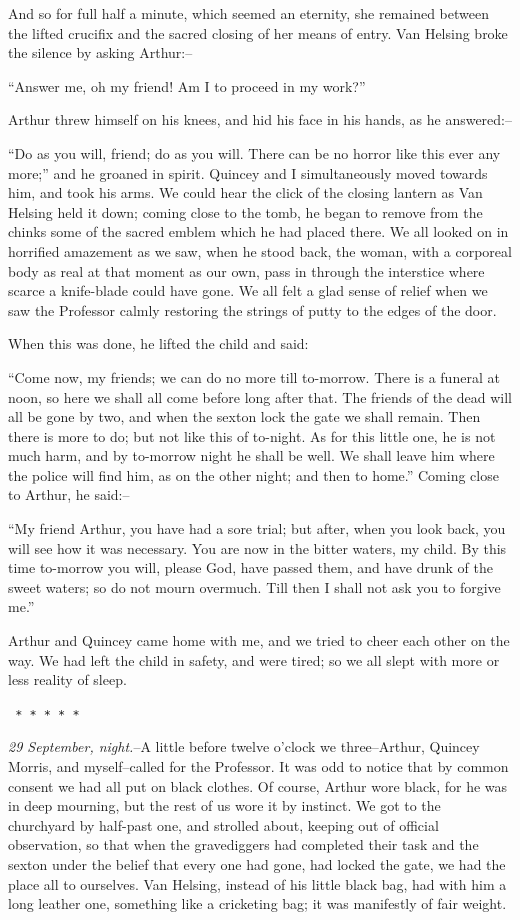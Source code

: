 \documentclass[12pt,openright]{book}
\begin{document}
And so for full half a minute, which seemed an eternity, she remained between the lifted crucifix and the sacred closing of her means of entry. Van Helsing broke the silence by asking Arthur:–

“Answer me, oh my friend! Am I to proceed in my work?”

Arthur threw himself on his knees, and hid his face in his hands, as he answered:–

“Do as you will, friend; do as you will. There can be no horror like this ever any more;” and he groaned in spirit. Quincey and I simultaneously moved towards him, and took his arms. We could hear the click of the closing lantern as Van Helsing held it down; coming close to the tomb, he began to remove from the chinks some of the sacred emblem which he had placed there. We all looked on in horrified amazement as we saw, when he stood back, the woman, with a corporeal body as real at that moment as our own, pass in through the interstice where scarce a knife-blade could have gone. We all felt a glad sense of relief when we saw the Professor calmly restoring the strings of putty to the edges of the door.

When this was done, he lifted the child and said:

“Come now, my friends; we can do no more till to-morrow. There is a funeral at noon, so here we shall all come before long after that. The friends of the dead will all be gone by two, and when the sexton lock the gate we shall remain. Then there is more to do; but not like this of to-night. As for this little one, he is not much harm, and by to-morrow night he shall be well. We shall leave him where the police will find him, as on the other night; and then to home.” Coming close to Arthur, he said:–

“My friend Arthur, you have had a sore trial; but after, when you look back, you will see how it was necessary. You are now in the bitter waters, my child. By this time to-morrow you will, please God, have passed them, and have drunk of the sweet waters; so do not mourn overmuch. Till then I shall not ask you to forgive me.”

Arthur and Quincey came home with me, and we tried to cheer each other on the way. We had left the child in safety, and were tired; so we all slept with more or less reality of sleep.

\texttt{   *       *       *       *       *}

\textit{29 September, night.}–A little before twelve o’clock we three–Arthur, Quincey Morris, and myself–called for the Professor. It was odd to notice that by common consent we had all put on black clothes. Of course, Arthur wore black, for he was in deep mourning, but the rest of us wore it by instinct. We got to the churchyard by half-past one, and strolled about, keeping out of official observation, so that when the gravediggers had completed their task and the sexton under the belief that every one had gone, had locked the gate, we had the place all to ourselves. Van Helsing, instead of his little black bag, had with him a long leather one, something like a cricketing bag; it was manifestly of fair weight.
\end{document}
